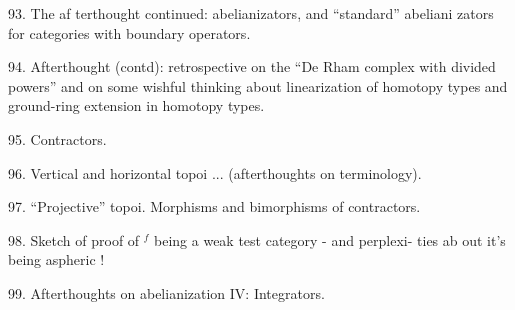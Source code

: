 93. The af terthought continued: abelianizators, and ``standard'' abeliani
zators for categories with boundary operators.

94. Afterthought (contd): retrospective on the ``De Rham complex with
divided powers'' and on some wishful thinking about linearization
of homotopy types and  ground-ring extension in homotopy types.

\hand{[}95. Contractors.

96. Vertical and horizontal topoi ... (afterthoughts on terminology).

97. ``Projective'' topoi. Morphisms and bimorphisms of contractors.

98. Sketch of proof of \hand{$\Delta$}$^{f}$ being a weak test category -  and perplexi-%
ties ab out it's being aspheric ! \hand{]}

99. Afterthoughts on abelianization IV: Integrators.

